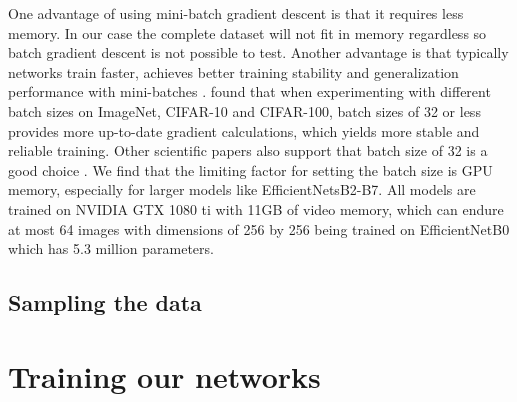 \documentclass[thesis.tex]{subfiles}
\begin{document}
One advantage of using mini-batch gradient descent is that it requires less memory. In our case the complete dataset will not fit in memory regardless so batch gradient descent is not possible to test. Another advantage is that typically networks train faster, achieves better training stability and generalization performance with mini-batches \cite{RevisitingSmall18}. \citeauthor{RevisitingSmall18} found that when experimenting with different batch sizes on ImageNet, CIFAR-10 and CIFAR-100, batch sizes of 32 or less provides more up-to-date gradient calculations, which yields more stable and reliable training. Other scientific papers also support that batch size of 32 is a good choice \cite{PracticalRecommendations12, GeneralInefficiency03}.
We find that the limiting factor for setting the batch size is GPU memory, especially for larger models like EfficientNetsB2-B7. All models are trained on NVIDIA GTX 1080 ti with 11GB of video memory, which can endure at most 64 images with dimensions of 256 by 256 being trained on EfficientNetB0 which has 5.3 million parameters.



\subsection{Sampling the data}




\section{Training our networks}
\end{document}
